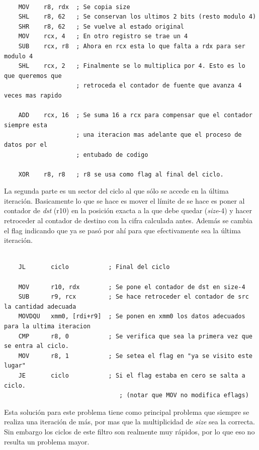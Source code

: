 \begin{verbatim}

	MOV    r8, rdx  ; Se copia size
	SHL    r8, 62   ; Se conservan los ultimos 2 bits (resto modulo 4)		
	SHR    r8, 62   ; Se vuelve al estado original
	MOV    rcx, 4   ; En otro registro se trae un 4
	SUB    rcx, r8  ; Ahora en rcx esta lo que falta a rdx para ser modulo 4
	SHL    rcx, 2   ; Finalmente se lo multiplica por 4. Esto es lo que queremos que
                    ; retroceda el contador de fuente que avanza 4 veces mas rapido
									
	ADD    rcx, 16  ; Se suma 16 a rcx para compensar que el contador siempre esta
                    ; una iteracion mas adelante que el proceso de datos por el
                    ; entubado de codigo

	XOR	   r8, r8 	; r8 se usa como flag al final del ciclo.						

\end{verbatim}


	La segunda parte es un sector del ciclo al que sólo se accede en la última
iteración. Basicamente lo que se hace es mover el límite de se hace es
poner al contador de \textit{dst} (r10) en la posición exacta a la que debe
quedar (\textit{size}-4) y hacer retroceder al contador de destino
con la cifra calculada antes. Además se cambia el flag indicando que ya
se pasó por ahí para que efectivamente sea la última iteración.



\begin{verbatim}

	JL       ciclo           ; Final del ciclo

	MOV      r10, rdx        ; Se pone el contador de dst en size-4
	SUB      r9, rcx         ; Se hace retroceder el contador de src la cantidad adecuada
	MOVDQU   xmm0, [rdi+r9]  ; Se ponen en xmm0 los datos adecuados para la ultima iteracion
	CMP      r8, 0           ; Se verifica que sea la primera vez que se entra al ciclo.
	MOV      r8, 1           ; Se setea el flag en "ya se visito este lugar"
	JE       ciclo           ; Si el flag estaba en cero se salta a ciclo. 
                                ; (notar que MOV no modifica eflags)

\end{verbatim}


	Esta solución para este problema tiene como principal problema
que siempre se realiza una iteración de más, por mas que la multiplicidad
de \textit{size} sea la correcta. Sin embargo los ciclos
de este filtro son realmente muy rápidos, por lo que eso no resulta
un problema mayor.

